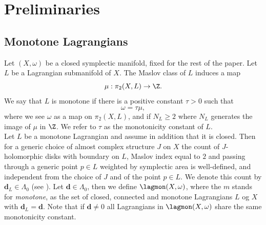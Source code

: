 
\section{Preliminaries}\label{preliminaries}



\subsection{Monotone Lagrangians}\label{monotonelags}
Let $(X,\omega)$ be a closed symplectic manifold, fixed for the rest of the paper.
Let $L$ be a Lagrangian submanifold of $X$. The Maslov class of $L$ induces a map $$\mu: \pi_2(X,L)\to \Z.$$ We say that $L$ is monotone if there is a positive constant $\tau>0$ such that $$\omega = \tau \mu,$$ where we see $\omega$ as a map on $\pi_2(X,L)$, and if $N_L\geq 2$ where $N_L$ generates the image of $\mu$ in $\Z$. We refer to $\tau$ as the monotonicity constant of $L$.\\
Let $L$ be a monotone Lagrangian and assume in addition that it is closed. Then for a generic choice of almost complex structure $J$ on $X$ the count of $J$-holomorphic disks with boundary on $L$, Maslov index equal to $2$ and passing through a generic point $p\in L$ weighted by symplectic area is well-defined, and independent from the choice of $J$ and of the point $p\in L$. We denote this count by $\mathbf{d}_L\in \Lambda_0$ (see \cite{Lazzarini2011RelativeCurves}). Let $\mathbf{d}\in \Lambda_0$, then we define $\lagmon(X,\omega)$, where the $m$ stands for \textit{monotone}, as the set of closed, connected and monotone Lagrangians $L$ og $X$ with $\mathbf{d}_L=\mathbf{d}$. Note that if $\mathbf{d}\neq 0$ all Lagrangians in $\lagmon(X,\omega)$ share the same monotonicity constant.




